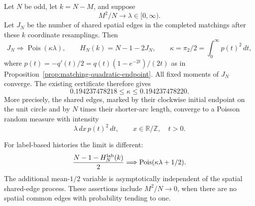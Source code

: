 \documentclass[11pt,letterpaper]{article}
\newcommand{\T}{\mathbb R/\mathbb Z}\newcommand{\Leb}{\operatorname{Leb}}
\begin{document}
\begin{theorem}
\label{thm:endpoint-Poisson}
Let $N$ be odd, let $k=N-M$, and suppose
\[
 M^2/N\longrightarrow\lambda\in[0,\infty).
\]
Let $J_N$ be the number of shared spatial edges in the completed
matchings after these $k$ coordinate resamplings. Then
\begin{equation}\label{eq:endpoint-Poisson}
 J_N\Longrightarrow\operatorname{Pois}(\kappa\lambda),
 \qquad
 H_N(k)=N-1-2J_N,
 \qquad
 \kappa=\pi_2/2=\int_0^\infty p(t)^2\,dt,
\end{equation}
where
$p(t)=-q'(t)/2=q(t)(1-e^{-2t})/(2t)$ as in
Proposition~\ref{prop:matching-quadratic-endpoint}.
All fixed moments of $J_N$ converge. The existing certificate
therefore gives
\[
 0.194237478218\le\kappa\le0.194237478220.
\]
More precisely, the shared edges, marked by their clockwise
initial endpoint on the unit circle and by $N$ times their
shorter-arc length, converge to a Poisson random measure
with intensity
\[
 \lambda\,dx\,p(t)^2\,dt,\qquad x\in\T,\quad t>0.
\]

For label-based histories the limit is different:
\begin{equation}\label{eq:endpoint-label-Poisson}
 \frac{N-1-H_N^{\rm lab}(k)}2
       \Longrightarrow\operatorname{Pois}(\kappa\lambda+1/2).
\end{equation}
The additional mean-$1/2$ variable is asymptotically independent
of the spatial shared-edge process. These assertions include
$M^2/N\to0$, when there are no spatial common edges with
probability tending to one.
\end{theorem}
\end{document}
